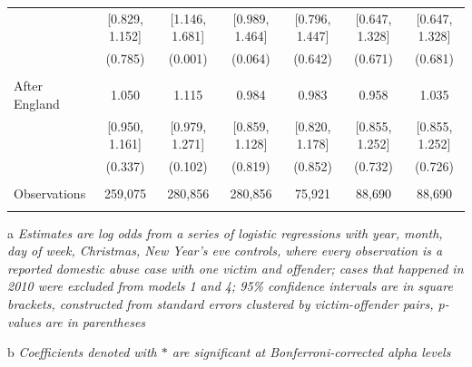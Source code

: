 \documentclass[12pt, a4paper]{article}
\begin{document}
\begin{table}
{\begin{threeparttable}
\begin{tabular}{@{\extracolsep{5pt}}lcccccc}
  & [0.829, 1.152] & [1.146, 1.681] & [0.989, 1.464] & [0.796, 1.447] & [0.647, 1.328] & [0.647, 1.328] \\ 
  & (0.785) & (0.001) & (0.064) & (0.642) & (0.671) & (0.681) \\ 
  & & & & & & \\ 
 After England & 1.050 & 1.115 & 0.984 & 0.983 & 0.958 & 1.035 \\ 
  & [0.950, 1.161] & [0.979, 1.271] & [0.859, 1.128] & [0.820, 1.178] & [0.855, 1.252] & [0.855, 1.252] \\ 
  & (0.337) & (0.102) & (0.819) & (0.852) & (0.732) & (0.726) \\


\hline \\[-1.8ex] 
Observations & 259,075 & 280,856 & 280,856 & 75,921 & 88,690 & 88,690 \\   
\hline 
\hline \\[-1.8ex] 
\end{tabular} 
\begin{tablenotes}
      \item[a] \textit{Estimates are log odds from a series of logistic regressions with year, month, day of week, Christmas, New Year's eve controls, where every observation is a reported domestic abuse case with one victim and offender; cases that happened in 2010 were excluded from models 1 and 4; 95\% confidence intervals are in square brackets, constructed from standard errors clustered by victim-offender pairs, p-values are in parentheses}
                         \item[b] \textit{Coefficients denoted with $*$ are significant at Bonferroni-corrected alpha levels}
    \end{tablenotes}
\end{threeparttable}   }
\end{table}
\end{document}
